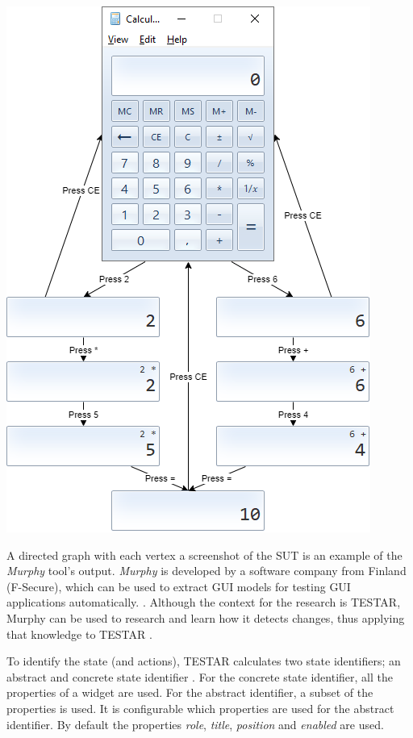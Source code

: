 \begingroup
\captionsetup{type=figure}
\includegraphics[scale=0.5]{pics/calc-state-example.png}
\label{fig:state-example}
\endgroup

A directed graph with each vertex a screenshot of the SUT is an example of the \emph{Murphy} tool's output. \emph{Murphy} is developed by a software company from Finland (F-Secure), which can be used to extract GUI models for testing GUI applications automatically. \cite{aho2013industrial}. Although the context for the research is TESTAR, Murphy can be used to research and learn how it detects changes, thus applying that knowledge to TESTAR \cite{murphy-extract-gui}.

To identify the state (and actions), TESTAR calculates two state identifiers; an abstract and concrete state identifier \cite{thesisMulders}. For the concrete state identifier, all the properties of a widget are used. For the abstract identifier, a subset of the properties is used. It is configurable which properties are used for the abstract identifier. By default the properties \textit{role}, \textit{title}, \textit{position} and \textit{enabled} are used.

